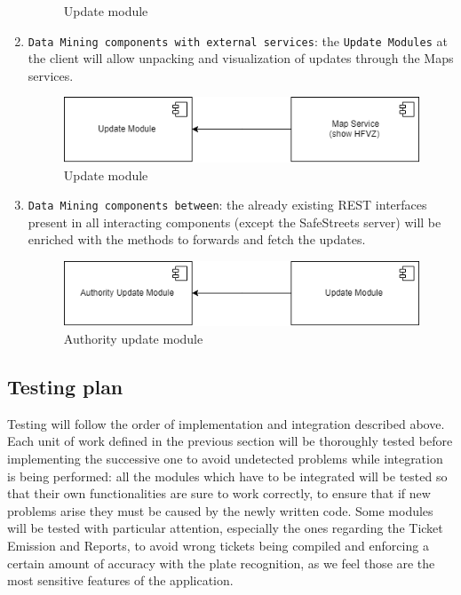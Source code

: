 \documentclass[12pt,a4paper]{article}
\begin{document}
\begin{enumerate}
\begin{figure}[H]
		\caption{Update module}
\end{figure}
\item \texttt{Data Mining components with external services}: the \texttt{Update Modules} at the client will allow unpacking and visualization of updates through the Maps services. 
\begin{figure}[H]
		\centering
			\includegraphics[width=1.0\linewidth]{Images/Integration/StatisticIntegrationChart2}
		\caption{Update module}
\end{figure}
\item \texttt{Data Mining components between}: the already existing REST interfaces present in all interacting components (except the SafeStreets server) will be enriched with the methods to forwards and fetch the updates.
\begin{figure}[H]
		\centering
			\includegraphics[width=1.0\linewidth]{Images/Integration/StatisticIntegrationChart3}
		\caption{Authority update module}
\end{figure}
\end{enumerate}
\newpage
\subsection{Testing plan}
Testing will follow the order of implementation and integration described above.
Each unit of work defined in the previous section will be thoroughly tested before implementing the successive one to avoid undetected problems while integration is being performed: all the modules which have to be integrated will be tested so that their own functionalities are sure to work correctly, to ensure that if new problems arise they must be caused by the newly written code. Some modules will be tested with particular attention, especially the ones regarding the Ticket Emission and Reports, to avoid wrong tickets being compiled and enforcing a certain amount of accuracy with the plate recognition, as we feel those are the most sensitive features of the application.
\newpage
\end{document}
